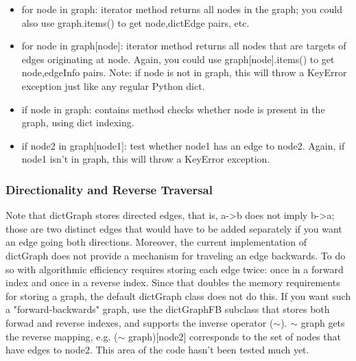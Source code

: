 \documentclass{howto}
\begin{document}
\begin{itemize}

\item
for node in graph: iterator method returns all nodes in the graph; you could also use graph.items() to get node,dictEdge pairs, etc.

\item
for node in graph[node]:  iterator method returns all nodes that are targets of edges originating at node.  Again, you could use graph[node].items() to get node,edgeInfo pairs.  Note: if node is not in graph, this will throw a KeyError exception just like any regular Python dict.

\item
if node in graph:  contains method checks whether node is present in the graph, using dict indexing.

\item
if node2 in graph[node1]:  test whether node1 has an edge to node2.  Again, if node1 isn't in graph, this will throw a KeyError exception.

\end{itemize}

\subsubsection{Directionality and Reverse Traversal}

Note that dictGraph stores directed edges, that is, a->b does not imply b->a; those are two distinct edges that would have to be added separately if you want an edge going both directions.  Moreover, the current implementation of dictGraph does not provide a mechanism for traveling an edge backwards.  To do so with algorithmic efficiency requires storing each edge twice: once in a forward index and once in a reverse index.  Since that doubles the memory requirements for storing a graph, the default dictGraph class does not do this.  If you want such a "forward-backwards" graph, use the dictGraphFB subclass that stores both forwad and reverse indexes, and supports the inverse operator ($\sim$).  $\sim$ graph gets the reverse mapping, e.g. ($\sim$ graph)[node2] corresponds to the set of nodes that have edges to node2.  This area of the code hasn't been tested much yet.
\end{document}

